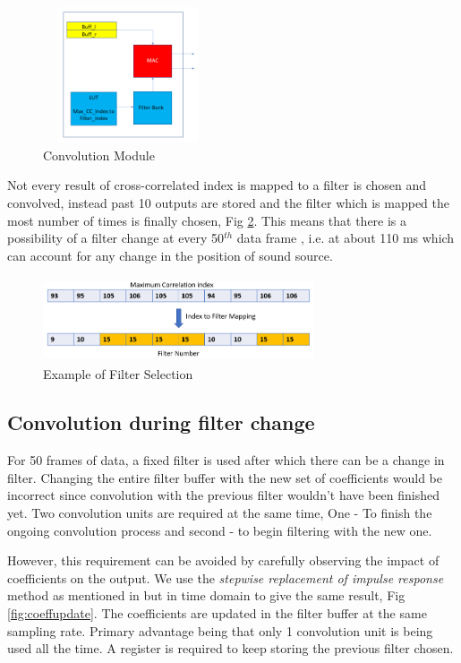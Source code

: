 \documentclass[conference]{IEEEtran}
\begin{document}
\begin{figure}
    \centering
    \includegraphics[width = 5cm, height = 4cm]{conv_module.png}
    \caption{Convolution Module}
    \label{fig:conv_module}
\end{figure}

Not every result of cross-correlated index is mapped to a filter is chosen and convolved, instead past 10 outputs are stored and the filter which is mapped the most number of times is finally chosen, Fig \ref{fig:past10}. This means that there is a possibility of a filter change at every 50$^{th}$ data frame , i.e. at about 110 ms which can account for any change in the position of sound source.

\begin{figure}
    \centering
    \includegraphics[width = 8cm, height = 2.5cm]{index_2_filter.png}
    \caption{Example of Filter Selection}
    \label{fig:past10}
\end{figure}

\subsection{Convolution during filter change}

For 50 frames of data, a fixed filter is used after which there can be a change in filter. Changing the entire filter buffer with the new set of coefficients would be incorrect since convolution with the previous filter wouldn't have been finished yet. Two convolution units are required at the same time, One - To finish the ongoing convolution process and second - to begin filtering with the new one.

However, this requirement can be avoided by carefully observing the impact of coefficients on the output. We use the \textit{stepwise replacement of impulse response} method as mentioned in \cite{live} but in time domain to give the same result, Fig \ref{fig:coeffupdate}. The coefficients are updated in the filter buffer at the same sampling rate. Primary advantage being that only 1 convolution unit is being used all the time. A register is required to keep storing the previous filter chosen. 
\end{document}
